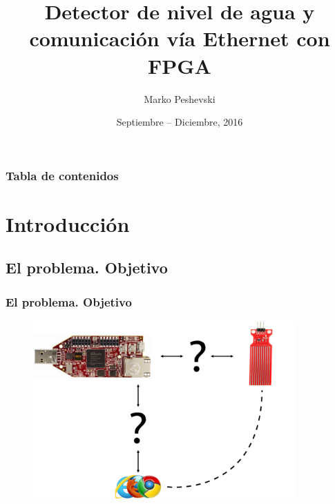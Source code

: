 \documentclass[compress]{beamer}
\title{Detector de nivel de agua y\\comunicaci\'on v\'ia Ethernet con FPGA}
\author{Marko Peshevski}
\institute{SDAV, MUESAEI}
\date{Septiembre -- Diciembre, 2016}
\begin{document}
\begin{frame}[plain]
	\titlepage
\end{frame}

\begin{frame}
    \frametitle{Tabla de contenidos}
    \tableofcontents
\end{frame}

\setcounter{framenumber}{0}
\section{Introducci\'on}
	\subsection{El problema. Objetivo}
		\begin{frame}
			\frametitle{El problema. Objetivo}
				\begin{figure}
					\includegraphics[keepaspectratio = true, width=0.9\textwidth]{figuras/introduccion.png}
				\end{figure}
		\end{frame}
\end{document}
